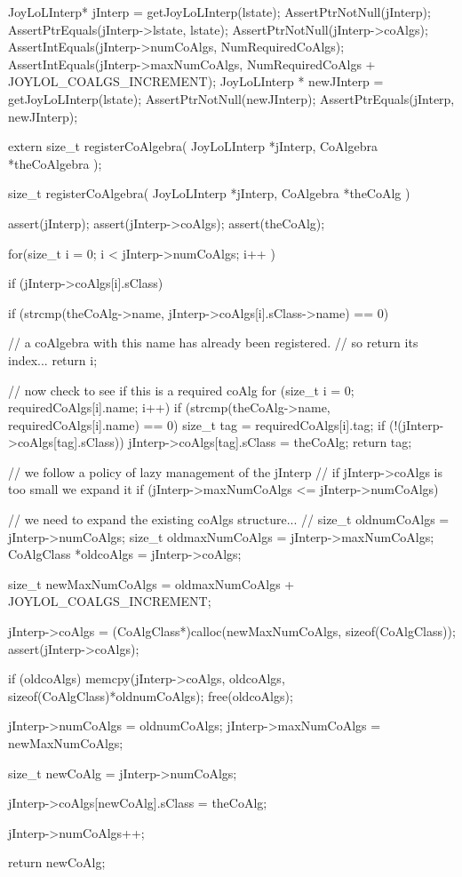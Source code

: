 
\startCTest
  JoyLoLInterp* jInterp = getJoyLoLInterp(lstate);
  AssertPtrNotNull(jInterp);
  AssertPtrEquals(jInterp->lstate, lstate);
  AssertPtrNotNull(jInterp->coAlgs);
  AssertIntEquals(jInterp->numCoAlgs, NumRequiredCoAlgs);
  AssertIntEquals(jInterp->maxNumCoAlgs,
    NumRequiredCoAlgs + JOYLOL_COALGS_INCREMENT);
  JoyLoLInterp * newJInterp = getJoyLoLInterp(lstate);
  AssertPtrNotNull(newJInterp);
  AssertPtrEquals(jInterp, newJInterp);
\stopCTest
\stopTestCase
\stopTestSuite

\startTestSuite[registerCoAlgebra]

\startCHeader
extern size_t registerCoAlgebra(
  JoyLoLInterp *jInterp,
  CoAlgebra *theCoAlgebra
);
\stopCHeader

\startCCode
size_t registerCoAlgebra(
  JoyLoLInterp *jInterp,
  CoAlgebra *theCoAlg
) {
  assert(jInterp);
  assert(jInterp->coAlgs);
  assert(theCoAlg);
  
  for(size_t i = 0; i < jInterp->numCoAlgs; i++ ) {
    if (jInterp->coAlgs[i].sClass) {
      if (strcmp(theCoAlg->name,
        jInterp->coAlgs[i].sClass->name) == 0) {
    
        // a coAlgebra with this name has already been registered. 
        // so return its index...
        return i;
      }
    }
  }

  // now check to see if this is a required coAlg
  for (size_t i = 0; requiredCoAlgs[i].name; i++) {
    if (strcmp(theCoAlg->name, requiredCoAlgs[i].name) == 0) {
      size_t tag = requiredCoAlgs[i].tag;
      if (!(jInterp->coAlgs[tag].sClass)) {
        jInterp->coAlgs[tag].sClass = theCoAlg;
      }
      return tag;
    }
  }

  // we follow a policy of lazy management of the jInterp
  // if jInterp->coAlgs is too small we expand it
  if (jInterp->maxNumCoAlgs <= jInterp->numCoAlgs) {
    // we need to expand the existing coAlgs structure...
    //  
    size_t oldnumCoAlgs    = jInterp->numCoAlgs;
    size_t oldmaxNumCoAlgs = jInterp->maxNumCoAlgs;
    CoAlgClass *oldcoAlgs  = jInterp->coAlgs;
    
    size_t newMaxNumCoAlgs =
      oldmaxNumCoAlgs + JOYLOL_COALGS_INCREMENT;

    jInterp->coAlgs =
      (CoAlgClass*)calloc(newMaxNumCoAlgs, sizeof(CoAlgClass));
    assert(jInterp->coAlgs);
    
    if (oldcoAlgs) {
      memcpy(jInterp->coAlgs,
        oldcoAlgs,
        sizeof(CoAlgClass)*oldnumCoAlgs);
      free(oldcoAlgs);
    }
    
    jInterp->numCoAlgs    = oldnumCoAlgs;
    jInterp->maxNumCoAlgs = newMaxNumCoAlgs;
  }
  
  size_t newCoAlg = jInterp->numCoAlgs;
  
  jInterp->coAlgs[newCoAlg].sClass      = theCoAlg;
  
  jInterp->numCoAlgs++;
  
  return newCoAlg;
}
\stopCCode

